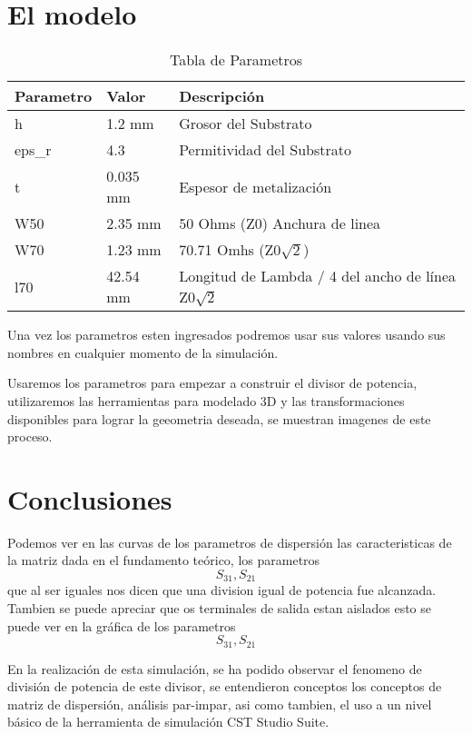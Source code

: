 \documentclass[a4paper]{IEEEtran} %
\begin{document}
\section{El modelo}

\begin{table}[h]
    \caption{Tabla de Parametros}
\begin{tabular}{@{}lll@{}}
\toprule
Parametro & Valor    & Descripción \\ \midrule
h         & 1.2 mm   & Grosor del Substrato \\
eps\_r    & 4.3      & Permitividad del Substrato \\
t         & 0.035 mm & Espesor de metalización \\ 
W50       & 2.35 mm  & 50 Ohms (Z0) Anchura de linea \\
W70       & 1.23 mm  & 70.71 Omhs (Z0$\sqrt{2}$) \\
l70       & 42.54 mm & Longitud de Lambda / 4 del ancho de línea Z0$\sqrt{2}$\\ \bottomrule
\end{tabular}
\label{tab:parametros_simulacion}
\end{table}



Una vez los parametros esten ingresados podremos usar sus valores usando sus nombres en cualquier momento de la simulación.

Usaremos los parametros para empezar a construir el divisor de potencia, utilizaremos las herramientas para modelado 3D y las transformaciones disponibles para lograr la geeometria deseada, se muestran imagenes de este proceso.


\section{Conclusiones}


Podemos ver en las curvas de los parametros de dispersión las caracteristicas de la matriz dada en el fundamento teórico, los parametros $$S_{31},S_{21}$$ que al ser iguales nos dicen que una division igual de potencia fue alcanzada.
Tambien se puede apreciar que os terminales de salida estan aislados esto se puede ver en la gráfica de los parametros $$S_{31},S_{21}$$ 

En la realización de esta simulación, se ha podido observar el fenomeno de división de potencia de este divisor, se entendieron conceptos los conceptos de matriz de dispersión, análisis par-impar, asi como tambien, el uso a un nivel básico de la herramienta de simulación CST Studio Suite.


\end{document}
